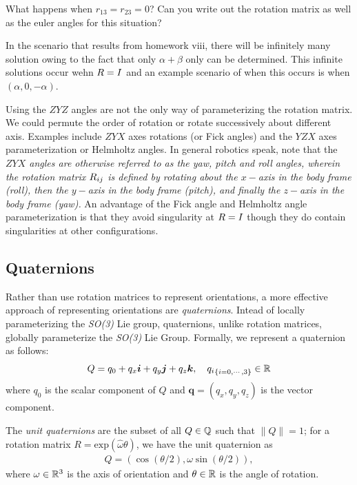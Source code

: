 \noindent 
\begin{homework}
	What happens when $r_{13} = r_{23} = 0$? Can you write out the rotation matrix as well as the euler angles for this situation?
\end{homework}

In the scenario that results from homework viii, there will be infinitely many solution owing to the fact that only $\alpha + \beta$ only can be determined. This infinite solutions occur wehn ${R} = I$ and an example scenario of when this occurs is when $(\alpha, 0, -\alpha)$.

Using the $ZYZ$ angles are not the only way of parameterizing the rotation matrix. We could permute the order of rotation or rotate successively about different axis. Examples include $ZYX$ axes rotations (or Fick angles) and the $YZX$ axes parameterization or Helmholtz angles. In general robotics speak, note that the \textit{$ZYX$  angles are otherwise referred to as the yaw, pitch and roll angles, wherein the rotation matrix ${R}_{ij}$ is defined by rotating about the $x-$axis in the body frame (roll), then the $y-$axis in the body frame (pitch), and finally the $z-$axis in the body frame (yaw). } An advantage of the Fick angle  and Helmholtz angle parameterization is that they avoid singularity at ${R} = I$ though they do contain singularities at other configurations.

\subsection{Quaternions}
%
Rather than use rotation matrices to represent orientations, a more effective approach of representing orientations are \textit{quaternions}. Intead of locally parameterizing the \textit{SO(3)} Lie group, quaternions, unlike rotation matrices, globally parameterize the \textit{SO(3)} Lie Group. Formally, we represent a quaternion as follows:
%
\begin{align}
	Q = q_0 + q_x \bm{i} + q_y \bm{j} + q_z \bm{k} , \quad {q_i}_{\{i = 0, \cdots, 3\}} \in \mathbb{R}
\end{align}
%
where $q_0$ is the scalar component of $Q$ and $\bm{q} = (q_x, q_y, q_z)$ is the vector component.

The \textit{unit quaternions} are the subset of all $Q \in \mathbb{Q}$ such that $\|Q\| = 1$; for a rotation matrix $R = \text{exp}(\hat{\omega}\theta)$, we have the unit quaternion as 
%
\begin{align}
	Q = \left(\cos(\theta/2), \omega \sin \left(\theta/2\right) \right),
\end{align}
%
where $\omega \in \mathbb{R}^3$ is the axis of orientation and $\theta \in \mathbb{R}$ is the angle of rotation.

